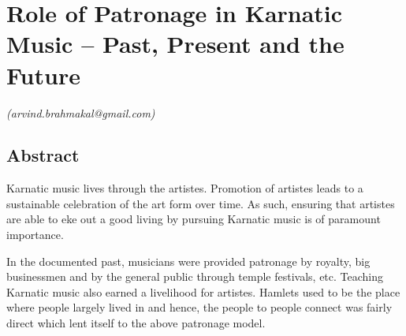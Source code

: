 
\chapter{Role of Patronage in Karnatic Music – Past, Present and the Future}\label{chapter8}



\vspace{-.3cm}

\begin{flushright}
\textit{(arvind.brahmakal@gmail.com)} 
\end{flushright}


\section*{Abstract}

\vspace{-.2cm}

Karnatic music lives through the artistes. Promotion of artistes leads to a sustainable celebration of the art form over time. As such, ensuring that artistes are able to eke out a good living by pursuing Karnatic music is of paramount importance.

In the documented past, musicians were provided patronage by royalty, big businessmen and by the general public through temple festivals, etc. Teaching Karnatic music also earned a livelihood for artistes. Hamlets used to be the place where people largely lived in and hence, the people to people connect was fairly direct which lent itself to the above patronage model.

